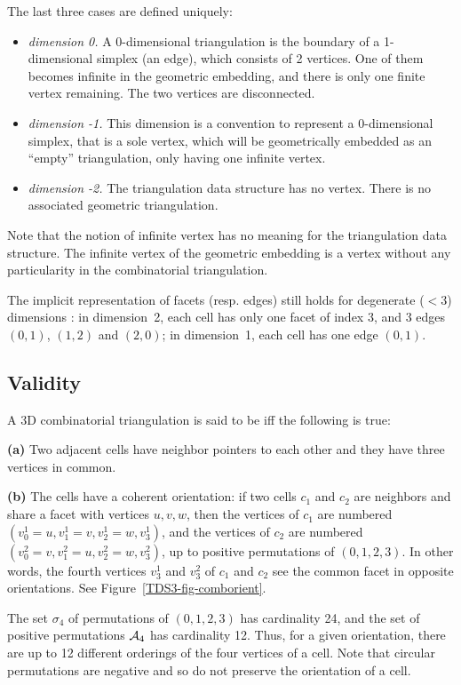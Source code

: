 The last three cases are defined uniquely:
\begin{itemize}
\item \emph{dimension 0.} A 0-dimensional triangulation is the
boundary of a 1-dimensional simplex (an edge), which consists of 2
vertices. One of them becomes infinite in the 
geometric embedding, and there is only one finite vertex remaining. The
two vertices are disconnected.
\item \emph{dimension -1.} This dimension is a convention to represent a 
0-dimensional simplex, that is a sole vertex, which will be
geometrically embedded as an ``empty'' triangulation, only having one
infinite vertex.
\item \emph{dimension -2.} The triangulation data structure has no
vertex. There is no associated geometric triangulation. 
\end{itemize} 

Note that the notion of infinite vertex has no meaning for the
triangulation data structure. The infinite vertex of the geometric
embedding is a vertex without any particularity in the
combinatorial triangulation.

The implicit representation of facets (resp. edges) still holds
for degenerate ($< 3$) dimensions : in dimension~2, each cell has only one
facet of index 3, and 3 edges $(0,1)$, $(1,2)$ and $(2,0)$; in
dimension~1, each cell has one edge $(0,1)$. 

\subsection{Validity}
\label{TDS3-sec-Valid}
A 3D combinatorial triangulation is said to be  
iff the following is true:

{\bf (a)} Two adjacent cells have neighbor pointers to each other and
they have three vertices in common. 

{\bf (b)} The cells have a coherent orientation: if two cells $c_1$
and $c_2$ are neighbors and share a facet with vertices $u,v,w$, then
the vertices of $c_1$ are numbered $(v_0^1 = u, v_1^1 = v, v_2^1 = w,
v_3^1)$, and the vertices of $c_2$ are numbered $(v_0^2 = v, v_1^2 = u,
v_2^2 = w, v_3^2)$, up to positive permutations of $(0,1,2,3)$. In
other words, the fourth vertices $v_3^1$ and $v_3^2$ of $c_1$ and
$c_2$ see the common facet in opposite orientations. See
Figure~\ref{TDS3-fig-comborient}.

The set {\Large $\sigma$}$_4$ of permutations of
$(0,1,2,3)$ has cardinality 24, and the set of positive permutations
${\cal A}_4$ has cardinality 12. Thus, for a given orientation, there
are up to 12 different orderings of the four vertices of a cell. Note
that circular permutations are negative and so do not preserve the
orientation of a cell.

